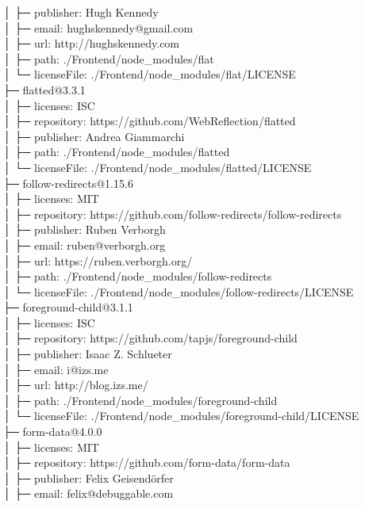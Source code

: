 │  ├─ publisher: Hugh Kennedy\\
│  ├─ email: hughskennedy@gmail.com\\
│  ├─ url: http://hughskennedy.com\\
│  ├─ path: ./Frontend/node\_modules/flat\\
│  └─ licenseFile: ./Frontend/node\_modules/flat/LICENSE\\
├─ flatted@3.3.1\\
│  ├─ licenses: ISC\\
│  ├─ repository: https://github.com/WebReflection/flatted\\
│  ├─ publisher: Andrea Giammarchi\\
│  ├─ path: ./Frontend/node\_modules/flatted\\
│  └─ licenseFile: ./Frontend/node\_modules/flatted/LICENSE\\
├─ follow-redirects@1.15.6\\
│  ├─ licenses: MIT\\
│  ├─ repository: https://github.com/follow-redirects/follow-redirects\\
│  ├─ publisher: Ruben Verborgh\\
│  ├─ email: ruben@verborgh.org\\
│  ├─ url: https://ruben.verborgh.org/\\
│  ├─ path: ./Frontend/node\_modules/follow-redirects\\
│  └─ licenseFile: ./Frontend/node\_modules/follow-redirects/LICENSE\\
├─ foreground-child@3.1.1\\
│  ├─ licenses: ISC\\
│  ├─ repository: https://github.com/tapjs/foreground-child\\
│  ├─ publisher: Isaac Z. Schlueter\\
│  ├─ email: i@izs.me\\
│  ├─ url: http://blog.izs.me/\\
│  ├─ path: ./Frontend/node\_modules/foreground-child\\
│  └─ licenseFile: ./Frontend/node\_modules/foreground-child/LICENSE\\
├─ form-data@4.0.0\\
│  ├─ licenses: MIT\\
│  ├─ repository: https://github.com/form-data/form-data\\
│  ├─ publisher: Felix Geisendörfer\\
│  ├─ email: felix@debuggable.com\\

